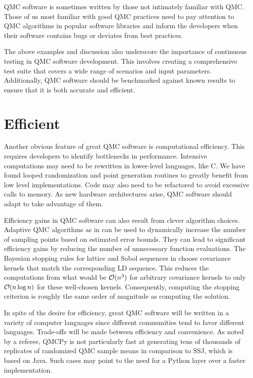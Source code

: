 \documentclass[graybox]{svmult}
\begin{document}
QMC software is sometimes written by those not intimately familiar with QMC.  Those of us most familiar with good QMC practices need to pay attention to QMC algorithms in popular software libraries and inform the developers when their software contains bugs or deviates from best practices.

The above examples and discussion also underscore the importance of continuous testing in QMC software development. This involves creating a comprehensive test suite that covers a wide range of scenarios and input parameters. Additionally, QMC software should be benchmarked against known results to ensure that it is both accurate and efficient.


\section{Efficient} \label{CDHJS_sec:efficient}
Another obvious feature of great QMC software is computational efficiency.  This requires developers to identify bottlenecks in performance. Intensive computations may need to be rewritten in lower-level languages, like C. We have found looped randomization and point generation routines to greatly benefit from low level implementations. Code may also need to be refactored to avoid excessive calls to memory.  As new hardware architectures arise, QMC software should adapt to take advantage of them.

Efficiency gains in QMC software can also result from clever algorithm choices. Adaptive QMC algorithms as in \cite{JimHic16a, HicJim16a, HicEtal17a, RatHic19a,JagHic22a} can be used to dynamically increase the number of sampling points based on estimated error bounds. They can lead to significant efficiency gains by reducing the number of unnecessary function evaluations. The Bayesian stopping rules for lattice and Sobol sequences in \cite{RatHic19a,JagHic22a} choose covariance kernels that match the corresponding LD sequence.  This reduces the computations from what would be ${\mathcal{O}}(n^3)$ for arbitrary covariance kernels to only ${\mathcal{O}}(n \log n)$ for these well-chosen kernels. Consequently, computing the stopping criterion is roughly the same order of magnitude as computing the solution.

In spite of the desire for efficiency, great QMC software will be written in a variety of computer languages since different communities tend to favor different languages. Trade-offs will be made between efficiency and convenience.
As noted by a referee, QMCPy is not particularly fast at generating tens of thousands of replicates of randomized QMC sample means in comparison to SSJ, which is based on Java. Such cases may point to the need for a Python layer over a faster implementation.
\end{document}
